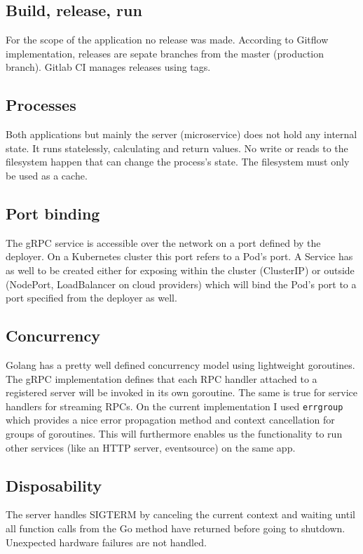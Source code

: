 \documentclass[a4paper,10pt]{article}
\begin{document}
\subsection{Build, release, run}
For the scope of the application no release was made. According to Gitflow implementation,
releases are sepate branches from the master (production branch). Gitlab CI manages releases using tags.
\subsection{Processes}
Both applications but mainly the server (microservice) does not hold any internal state. 
It runs statelessly, calculating and return values. No write or reads to the filesystem 
happen that can change the process's state. The filesystem must only be used as a cache.
\subsection{Port binding}
The gRPC service is accessible over the network on a port defined by the deployer. On a 
Kubernetes cluster this port refers to a Pod's port. A Service has as well to be created 
either for exposing within the cluster (ClusterIP) or outside (NodePort, LoadBalancer on 
cloud providers) which will bind the Pod's port to a port specified from the deployer as well.
\subsection{Concurrency}
Golang has a pretty well defined concurrency model using lightweight goroutines. The 
gRPC implementation defines that each RPC handler attached to a registered server will be invoked in its own goroutine. The same is true for service handlers for streaming RPCs. On 
the current implementation I used \texttt{errgroup} which provides a nice error propagation method and context cancellation for groups of goroutines. This will furthermore 
enables us the functionality to run other services (like an HTTP server, eventsource) on the same app.
\subsection{Disposability}
The server handles SIGTERM by canceling the current context and waiting until all function calls from the Go method have returned before going to shutdown. 
Unexpected hardware failures are not handled.
\end{document}
